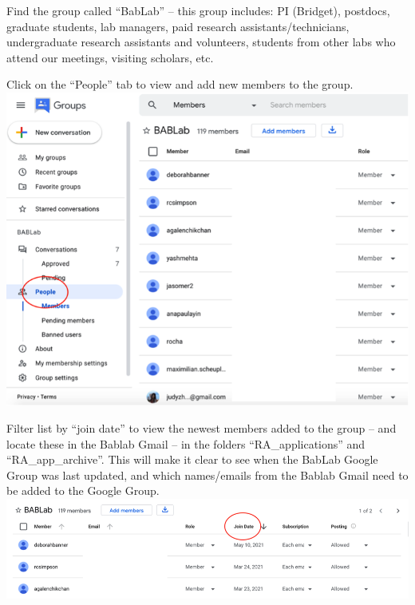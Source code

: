 \documentclass[]{book}
\begin{document}
Find the group called ``BabLab'' -- this group includes: PI (Bridget), postdocs, graduate students, lab managers, paid research assistants/technicians, undergraduate research assistants and volunteers, students from other labs who attend our meetings, visiting scholars, etc.

Click on the ``People'' tab to view and add new members to the group.
\includegraphics{images/lab_protocols/listserv/listserv_4.png}

Filter list by ``join date'' to view the newest members added to the group -- and locate these in the Bablab Gmail -- in the folders ``RA\_applications'' and ``RA\_app\_archive''. This will make it clear to see when the BabLab Google Group was last updated, and which names/emails from the Bablab Gmail need to be added to the Google Group.
\includegraphics{images/lab_protocols/listserv/listserv_5.png}
\end{document}
